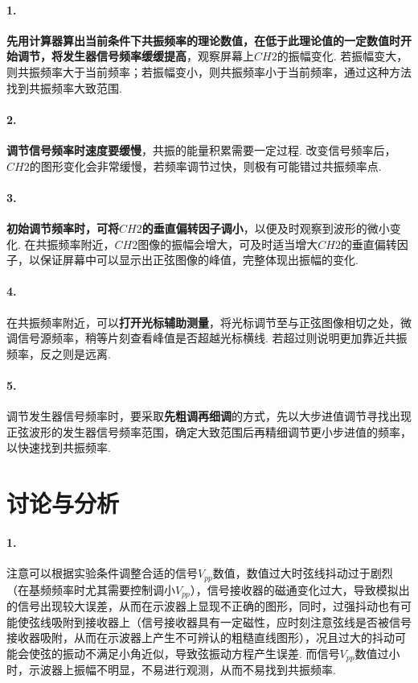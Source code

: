 \documentclass[UTF8]{ctexart}
\begin{document}
\paragraph{1.}\textbf{先用计算器算出当前条件下共振频率的理论数值，在低于此理论值的一定数值时开始调节，将发生器信号频率缓缓提高}，观察屏幕上$CH2$的振幅变化. 若振幅变大，则共振频率大于当前频率；若振幅变小，则共振频率小于当前频率，通过这种方法找到共振频率大致范围.
\paragraph{2.}\textbf{调节信号频率时速度要缓慢}，共振的能量积累需要一定过程. 改变信号频率后，$CH2$的图形变化会非常缓慢，若频率调节过快，则极有可能错过共振频率点.
\paragraph{3.}\textbf{初始调节频率时，可将$CH2$的垂直偏转因子调小}，以便及时观察到波形的微小变化. 在共振频率附近，$CH2$图像的振幅会增大，可及时适当增大$CH2$的垂直偏转因子，以保证屏幕中可以显示出正弦图像的峰值，完整体现出振幅的变化.
\paragraph{4.}在共振频率附近，可以\textbf{打开光标辅助测量}，将光标调节至与正弦图像相切之处，微调信号源频率，稍等片刻查看峰值是否超越光标横线. 若超过则说明更加靠近共振频率，反之则是远离.
\paragraph{5.}调节发生器信号频率时，要采取\textbf{先粗调再细调}的方式，先以大步进值调节寻找出现正弦波形的发生器信号频率范围，确定大致范围后再精细调节更小步进值的频率，以快速找到共振频率.

\section{讨论与分析}
\paragraph{1.}注意可以根据实验条件调整合适的信号$V_{pp}$数值，数值过大时弦线抖动过于剧烈（在基频频率时尤其需要控制调小$V_{pp}$），信号接收器的磁通变化过大，导致模拟出的信号出现较大误差，从而在示波器上显现不正确的图形，同时，过强抖动也有可能使弦线吸附到接收器上（信号接收器具有一定磁性，应时刻注意弦线是否被信号接收器吸附，从而在示波器上产生不可辨认的粗糙直线图形），况且过大的抖动可能会使弦的振动不满足小角近似，导致弦振动方程产生误差. 而信号$V_{pp}$数值过小时，示波器上振幅不明显，不易进行观测，从而不易找到共振频率.
\end{document}
